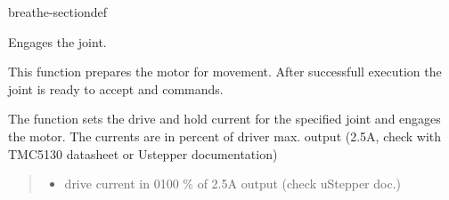 \documentclass[letterpaper,10pt,english]{sphinxmanual}
\begin{document}
\begin{fulllineitems}
\begin{sphinxuseclass}{breathe-sectiondef}
\begin{fulllineitems}
\label{\detokenize{code/bioscara_hardware_drivers/index:_CPPv4N25bioscara_hardware_drivers25bioscara_hardware_drivers9BaseJoint6enableE8u_int8_t8u_int8_t}}\label{\detokenize{code/bioscara_hardware_drivers/index:_CPPv3N25bioscara_hardware_drivers25bioscara_hardware_drivers9BaseJoint6enableE8u_int8_t8u_int8_t}}\label{\detokenize{code/bioscara_hardware_drivers/index:_CPPv2N25bioscara_hardware_drivers25bioscara_hardware_drivers9BaseJoint6enableE8u_int8_t8u_int8_t}}\label{\detokenize{code/bioscara_hardware_drivers/index:bioscara_hardware_drivers::bioscara_hardware_drivers::BaseJoint::enable__u_int8_t.u_int8_t}}
\pysigstartsignatures
\pysigstartmultiline
\pysiglinewithargsret
{\label{\detokenize{code/bioscara_hardware_drivers/index:classbioscara__hardware__drivers_1_1BaseJoint_1ab71c7a70946252c09efbd42b039b7eb0}}}
{\sphinxparamcomma {}}
{}
\pysigstopmultiline
\pysigstopsignatures
\sphinxAtStartPar
Engages the joint. 

\sphinxAtStartPar
This function prepares the motor for movement. After successfull execution the joint is ready to accept {\hyperref[\detokenize{code/bioscara_hardware_drivers/index:classbioscara__hardware__drivers_1_1BaseJoint_1ac16fc6fc228f1e4855ed0401a2c8368e}]{}} and {\hyperref[\detokenize{code/bioscara_hardware_drivers/index:classbioscara__hardware__drivers_1_1BaseJoint_1affb3dfb90967f45ed12ef67a5a6e7ed9}]{}} commands.

\sphinxAtStartPar
The function sets the drive and hold current for the specified joint and engages the motor. The currents are in percent of driver max. output (2.5A, check with TMC5130 datasheet or Ustepper documentation) 
\begin{quote}\begin{description}
\begin{itemize}
\item {} 
\sphinxAtStartPar
{} \textendash{} drive current in 0\sphinxhyphen{}100 \% of 2.5A output (check uStepper doc.) 


\end{itemize}
\end{description}
\end{quote}
\end{fulllineitems}
\end{sphinxuseclass}
\end{fulllineitems}
\end{document}
